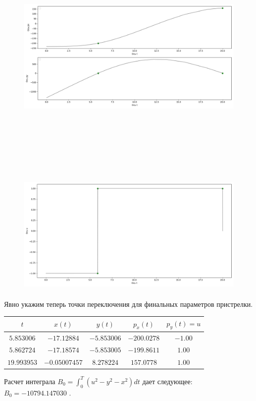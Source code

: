 \documentclass[a4paper,12pt]{article}
\begin{document}
\begin{figure}[H]
    \centering
      \includegraphics[width=\textwidth, height=12cm]{Figure4_2.png}
\end{figure}
\begin{figure}[H]
    \centering
      \includegraphics[width=\textwidth, height=6cm]{Figure4_3.png}
\end{figure}
Явно укажим теперь точки переключения для финальных параметров пристрелки.

\begin{center}
\begin{table}[H]
    \begin{tabular}{|c|c|c|c|c|}
        \hline
        $t$&$x(t)$&$y(t)$&$p_x(t)$&$p_y(t)=u$\\
        \hline
        $5.853006$&$-17.12884$&$-5.853006$&$-200.0278$&$-1.00$\\
        \hline
        $5.862724$&$-17.18574$&$-5.853005$&$-199.8611$&$1.00$\\
        \hline
        $19.993953$&$-0.05007457$&$8.278224$&$157.0778$&$1.00$\\
        \hline
    \end{tabular}
\end{table}
\end{center}
Расчет интеграла $B_0=\int_0^T(u^2-y^2-x^2)dt$ дает следующее: $B_0=-10794.147030$ .
\end{document}
